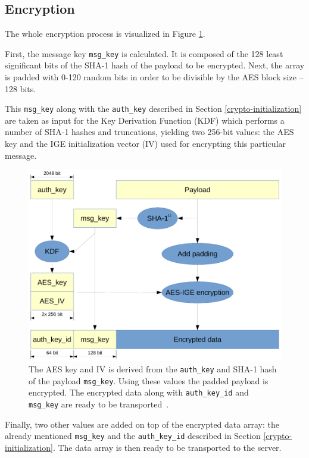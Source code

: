 \documentclass[thesis=M,english]{FITthesis}[2012/10/20]
\begin{document}
\subsection{Encryption}\label{crypto-regular-enc}

The whole encryption process is visualized in Figure \ref{img:crypto-regular-enc}.

First, the message key \texttt{msg\_key} is calculated. It is composed of the 128 least significant bits of the SHA-1 hash of the payload to be encrypted. Next, the array is padded with 0-120 random bits in order to be divisible by the AES block size -- 128 bits.

This \texttt{msg\_key} along with the \texttt{auth\_key} described in Section \ref{crypto-initialization} are taken as input for the Key Derivation Function (KDF) which performs a number of SHA-1 hashes and truncations, yielding two 256-bit values: the AES key and the IGE initialization vector (IV) used for encrypting this particular message.

\begin{figure}[htb]
	\centering
	\includegraphics[width=1\textwidth]{mtproto-encflow.pdf}
	\caption[MTProto encryption flow]{The AES key and IV is derived from the \texttt{auth\_key} and SHA-1 hash of the payload \texttt{msg\_key}. Using these values the padded payload is encrypted. The encrypted data along with \texttt{auth\_key\_id} and \texttt{msg\_key} are ready to be transported~\cite{telegram-aarhus}.}
	\label{img:crypto-regular-enc}
\end{figure}

Finally, two other values are added on top of the encrypted data array: the already mentioned \texttt{msg\_key} and the \texttt{auth\_key\_id} described in Section \ref{crypto-initialization}. The data array is then ready to be transported to the server.
\end{document}
